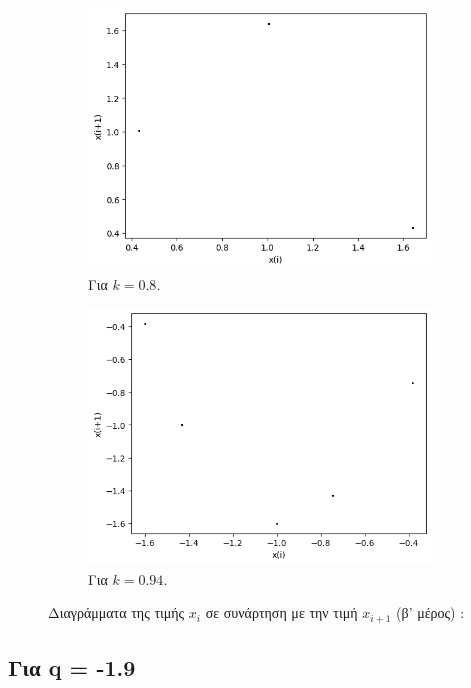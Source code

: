 \begin{figure}[h!]
\begin{subfigure}[b]{0.4\textwidth}
		\includegraphics[width=\textwidth]{LateX images/graphs q16/g19}
		\caption{Για $k=0.8$.}
		\label{f:k90}
	\end{subfigure}
	\hfill
	\begin{subfigure}[b]{0.4\textwidth}
		\centering
		\includegraphics[width=\textwidth]{LateX images/graphs q16/g20}
		\caption{Για $k=0.94$.}
		\label{f:k91}
	\end{subfigure}
	\hfill
	\caption{Διαγράμματα της τιμής \(x_i\) σε συνάρτηση με την τιμή \(x_{i+1}\) (β' μέρος) :}
	\label{f:k241}
\end{figure}


\clearpage
\newpage

\subsection{Για q = -1.9}

